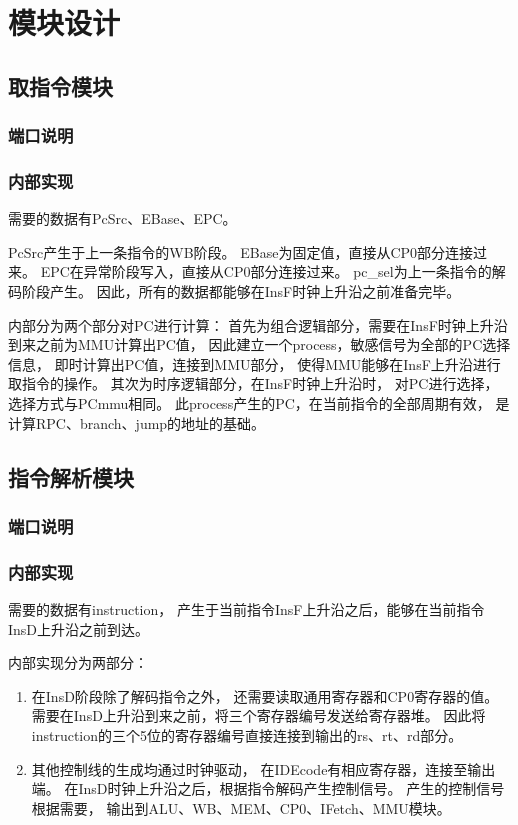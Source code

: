 \section{模块设计}
    \subsection{取指令模块}
        \subsubsection{端口说明}
             
        \subsubsection{内部实现}
            需要的数据有PcSrc、EBase、EPC。

            PcSrc产生于上一条指令的WB阶段。%
            EBase为固定值，直接从CP0部分连接过来。%
            EPC在异常阶段写入，直接从CP0部分连接过来。%
            pc\_sel为上一条指令的解码阶段产生。%
            因此，所有的数据都能够在InsF时钟上升沿之前准备完毕。

            内部分为两个部分对PC进行计算：%
            首先为组合逻辑部分，需要在InsF时钟上升沿到来之前为MMU计算出PC值，%
            因此建立一个process，敏感信号为全部的PC选择信息，%
            即时计算出PC值，连接到MMU部分，%
            使得MMU能够在InsF上升沿进行取指令的操作。%
            其次为时序逻辑部分，在InsF时钟上升沿时，%
            对PC进行选择，选择方式与PCmmu相同。%
            此process产生的PC，在当前指令的全部周期有效，%
            是计算RPC、branch、jump的地址的基础。%
    \subsection{指令解析模块}
        \subsubsection{端口说明}
            
        \subsubsection{内部实现}
            需要的数据有instruction，%
            产生于当前指令InsF上升沿之后，能够在当前指令InsD上升沿之前到达。

            内部实现分为两部分：%
            \begin{enumerate}
            \item
            在InsD阶段除了解码指令之外，%
            还需要读取通用寄存器和CP0寄存器的值。%
            需要在InsD上升沿到来之前，将三个寄存器编号发送给寄存器堆。%
            因此将instruction的三个5位的寄存器编号直接连接到输出的rs、rt、rd部分。%
            \item
            其他控制线的生成均通过时钟驱动，%
            在IDEcode有相应寄存器，连接至输出端。%
            在InsD时钟上升沿之后，根据指令解码产生控制信号。%
            产生的控制信号根据需要，%
            输出到ALU、WB、MEM、CP0、IFetch、MMU模块。
            \end{enumerate}


